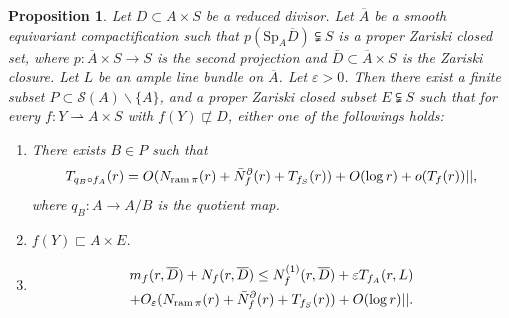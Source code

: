 \documentclass[11pt,english]{smfart}
\theoremstyle{plain}
\newtheorem{proposition}[thm]{Proposition}
\theoremstyle{definition}
\theoremstyle{remark}
\numberwithin{equation}{section}
\theoremstyle{plain}
\newcommand{\da}{\rightharpoonup}
\newcommand{\pN}[1]{\bar{N}_{#1}^{\partial}}
\newcommand{\ram}{{\rm ram}\,}
\begin{document}
	\begin{proposition}\label{lem:20220909}
		Let $D\subset A\times S$ be a reduced divisor.
		Let $\overline{A}$ be a smooth equivariant compactification such that $p(\mathrm{Sp}_A\overline{D})\subsetneqq S$ is a proper Zariski closed set, where $p:\overline{A}\times S\to S$ is the second projection and $\overline{D}\subset \overline{A}\times S$ is the Zariski closure.
		Let $L$ be an ample line bundle on $\overline{A}$.
		Let $\varepsilon>0$.
		Then there exist
		a finite subset $P\subset \mathcal{S}(A)\backslash \{ A\}$, and a proper Zariski closed subset $E\subsetneqq S$
		such that for every $f:Y\da A\times S$ with $f(Y)\not\sqsubset D$, either one of the followings holds:
		\begin{enumerate}
			\item
			There exists $B\in P$ such that 
			$$
			T_{q_B\circ f_A}(r)=O(N_{\ram\pi}(r)+\pN{f}(r)+T_{f_S}(r))+O(\log r)+o(T_f(r))||, 
			$$
			where $q_B:A\to A/B$ is the quotient map.
			\item
			$f(Y)\sqsubset A\times E$.
			\item
			\begin{multline*}
				m_f(r,\overline{D})+N_f(r,\overline{D})\leq N^{(1)}_f(r,\overline{D})
				+\varepsilon T_{f_A}(r,L)\\
				+O_{\varepsilon}(N_{\ram\pi}(r)+\pN{f}(r)
				+T_{f_S}(r))+O(\log r)||.
			\end{multline*}
		\end{enumerate}
	\end{proposition}
	
	
	
\end{document}
